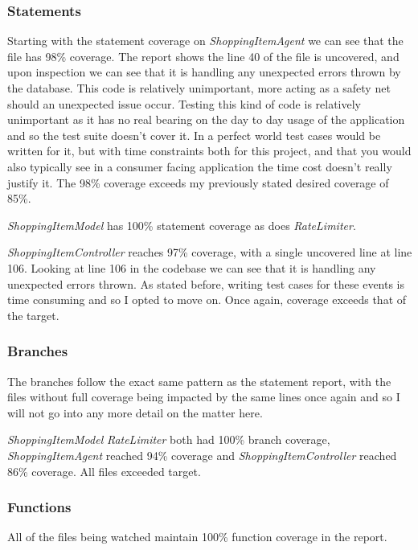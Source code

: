 \subsubsection{Statements}
Starting with the statement coverage on \textit{ShoppingItemAgent} we can see that the file has 98\% coverage. The report shows the line 40 of the file is uncovered, and upon inspection we can see that it is handling any unexpected errors thrown by the database. This code is relatively unimportant, more acting as a safety net should an unexpected issue occur. Testing this kind of code is relatively unimportant as it has no real bearing on the day to day usage of the application and so the test suite doesn't cover it. In a perfect world test cases would be written for it, but with time constraints both for this project, and that you would also typically see in a consumer facing application the time cost doesn't really justify it. The 98\% coverage exceeds my previously stated desired coverage of 85\%.


\textit{ShoppingItemModel} has 100\% statement coverage as does \textit{RateLimiter}.

\textit{ShoppingItemController} reaches 97\% coverage, with a single uncovered line at line 106. Looking at line 106 in the codebase we can see that it is handling any unexpected errors thrown. As stated before, writing test cases for these events is time consuming and so I opted to move on. Once again, coverage exceeds that of the target. 
\subsubsection{Branches}
The branches follow the exact same pattern as the statement report, with the files without full coverage being impacted by the same lines once again and so I will not go into any more detail on the matter here.

\textit{ShoppingItemModel} \textit{RateLimiter} both had 100\% branch coverage, \textit{ShoppingItemAgent} reached 94\% coverage and \textit{ShoppingItemController} reached 86\% coverage. All files exceeded target.

\subsubsection{Functions}
All of the files being watched maintain 100\% function coverage in the report.
